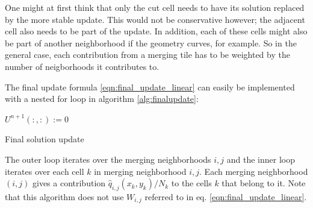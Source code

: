 One might at first think that only the cut cell needs to have its solution replaced
by the more stable update.  This would not be conservative however; the adjacent cell
also needs to be part of the update. In addition, each of these cells might also be part of
another neighborhood if the geometry curves, for example. So in the general case,
each contribution from a merging tile has to be weighted by the number of
neigborhoods it contributes to. 


The final update formula \eqref{eqn:final_update_linear} can easily be implemented with a 
nested for loop in algorithm \ref{alg:finalupdate}:  

\begin{algorithm}[H]
\SetAlgoLined
$U^{n+1}(:,:) := 0$\\
 \caption{\sf Final solution update} \label{alg:finalupdate}
\end{algorithm}
The outer loop iterates over the merging neighborhoods $i,j$ and the inner loop 
iterates over each cell $k$ in merging neighborhood $i,j$.  Each merging 
neighborhood $(i,j)$ gives a contribution $ \hat{q}_{i,j}(x_{k}, y_k)/N_{k} $ 
to the cells $k$ that belong to it. Note that this algorithm does not use
$W_{i,j}$ referred to in eq. \eqref{eqn:final_update_linear}.

